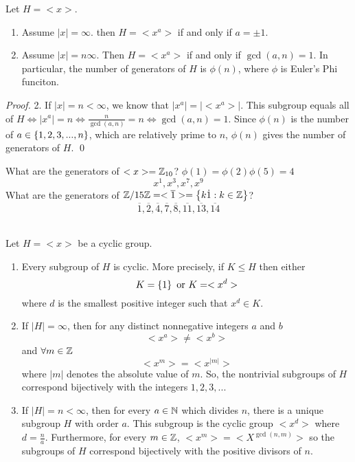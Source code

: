 \begin{proposition}
    Let $H = <x>$.
    \begin{enumerate}
        \item Assume $|x| = \infty.$ then $H = <x^a>$ if and only if $a = \pm 1$.
        \item Assume $|x| = n \infty$. Then $H = <x^a>$ if and only if $\gcd(a,n) = 1$. In particular, the number of generators of $H$ is $\phi(n)$, where $\phi$ is Euler's Phi funciton.
    \end{enumerate}
\end{proposition}

\begin{proof}
    2. If $|x| = n < \infty$, we know that $|x^a| = |<x^a>|.$ This subgroup equals all of $H \iff |x^a| = n \iff \frac{n}{\gcd(a,n)}=n \iff \gcd(a,n) = 1.$ Since $\phi(n)$ is the number of $a \in \left\{1, 2, 3,..., n\right\}$, which are relatively prime to $n$, $\phi(n)$ gives the number of generators of $H$.
    \qed
\end{proof}

What are the generators of $<x> = \mathbb{Z}_{10}$? $\phi(1) = \phi(2)\phi(5) = 4$
$$x^1, x^3, x^7, x^9$$
What are the generators of $\mathbb{Z}/15\mathbb{Z} = <\overline{1}> = \left\{k\dot 1 : k \in \mathbb{Z}\right\}$?
$$\overline{1}, \overline{2}, \overline{4}, \overline{7}, \overline{8},\overline{11},\overline{13},\overline{14}$$

\begin{theorem} \leavevmode\\
    Let $H=<x>$ be a cyclic group.
    \begin{enumerate}
        \item Every subgroup of $H$ is cyclic. More precisely, if $K \leq H$ then either
        $$K = \left\{1\right\} \text{ or } K = <x^d>$$
        where $d$ is the smallest positive integer such that $x^d \in K$.
        \item If $|H| = \infty$, then for any distinct nonnegative integers $a$ and $b$
        $$<x^a> \not = <x^b>$$
        and $\forall m \in \mathbb{Z}$
        $$<x^m> = <x^{|m|}>$$
        where $|m|$ denotes the absolute value of $m$. So, the nontrivial subgroups of $H$ correspond bijectively with the integers $1, 2, 3, ...$
        \item If $|H| = n < \infty$, then for every $a \in \mathbb{N}$ which divides $n$, there is a unique subgroup $H$ with order $a$. This subgroup is the cyclic group $<x^d>$ where $d = \frac{n}{a}$. Furthermore, for every $m \in \mathbb{Z}$, $<x^m> = <X^{\gcd(n,m)}>$ so the subgroups of $H$ correspond bijectively with the positive divisors of $n$.
    \end{enumerate}
\end{theorem}

